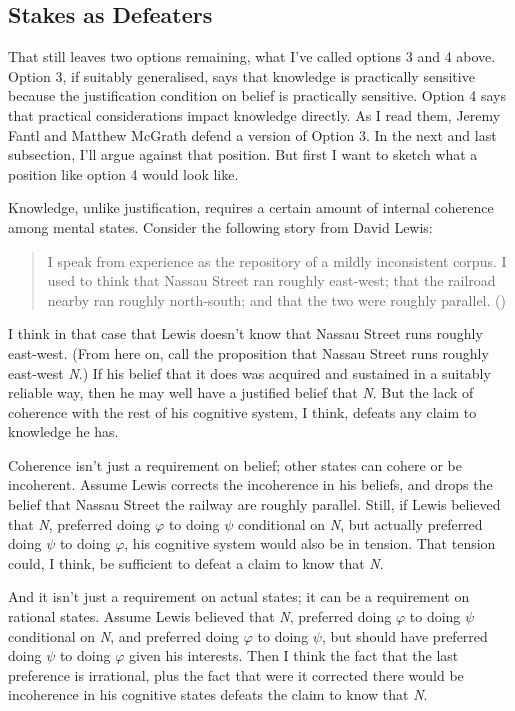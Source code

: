 \documentclass[
  10pt,
  letterpaper,
  DIV=11,
  numbers=noendperiod,
  twoside]{scrartcl}
\begin{document}
\subsection{Stakes as Defeaters}\label{stakes-as-defeaters}

That still leaves two options remaining, what I've called options 3 and
4 above. Option 3, if suitably generalised, says that knowledge is
practically sensitive because the justification condition on belief is
practically sensitive. Option 4 says that practical considerations
impact knowledge directly. As I read them, Jeremy Fantl and Matthew
McGrath defend a version of Option 3. In the next and last subsection,
I'll argue against that position. But first I want to sketch what a
position like option 4 would look like.

Knowledge, unlike justification, requires a certain amount of internal
coherence among mental states. Consider the following story from David
Lewis:

\begin{quote}
I speak from experience as the repository of a mildly inconsistent
corpus. I used to think that Nassau Street ran roughly east-west; that
the railroad nearby ran roughly north-south; and that the two were
roughly parallel. ()
\end{quote}

I think in that case that Lewis doesn't know that Nassau Street runs
roughly east-west. (From here on, call the proposition that Nassau
Street runs roughly east-west \emph{N}.) If his belief that it does was
acquired and sustained in a suitably reliable way, then he may well have
a justified belief that \emph{N}. But the lack of coherence with the
rest of his cognitive system, I think, defeats any claim to knowledge he
has.

Coherence isn't just a requirement on belief; other states can cohere or
be incoherent. Assume Lewis corrects the incoherence in his beliefs, and
drops the belief that Nassau Street the railway are roughly parallel.
Still, if Lewis believed that \emph{N}, preferred doing \(\varphi\) to
doing \(\psi\) conditional on \emph{N}, but actually preferred doing
\(\psi\) to doing \(\varphi\), his cognitive system would also be in
tension. That tension could, I think, be sufficient to defeat a claim to
know that \emph{N}.

And it isn't just a requirement on actual states; it can be a
requirement on rational states. Assume Lewis believed that \emph{N},
preferred doing \(\varphi\) to doing \(\psi\) conditional on \emph{N},
and preferred doing \(\varphi\) to doing \(\psi\), but should have
preferred doing \(\psi\) to doing \(\varphi\) given his interests. Then
I think the fact that the last preference is irrational, plus the fact
that were it corrected there would be incoherence in his cognitive
states defeats the claim to know that \emph{N}.
\end{document}
